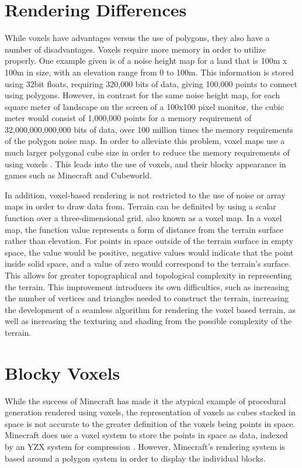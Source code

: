 \documentclass[10pt]{report}
\begin{document}
		\section{Rendering Differences}
		While voxels have advantages versus the use of polygons, they also have a number of disadvantages. Voxels require more memory in order to utilize properly. One example given is of a noise height map for a land that is 100m x 100m in size, with an elevation range from 0 to 100m. This information is stored using 32bit floats, requiring 320,000 bits of data, giving 100,000 points to connect using polygons. However, in contrast for the same noise height map, for each square meter of landscape on the screen of a 100x100 pixel monitor, the cubic meter would consist of 1,000,000 points for a memory requirement of 32,000,000,000,000 bits of data, over 100 million times the memory requirements of the polygon noise map. In order to alleviate this problem, voxel maps use a much larger polygonal cube size in order to reduce the memory requirements of using voxels \cite{high-level-voxel}. This leads into the use of voxels, and their blocky appearance in games such as Minecraft and Cubeworld.
		
		In addition, voxel-based rendering is not restricted to the use of noise or array maps in order to draw data from. Terrain can be definited by using a scalar function over a three-dimensional grid, also known as a voxel map. In a voxel map, the function value represents a form of distance from the terrain surface rather than elevation. For points in space outside of the terrain surface in empty space, the value would be positive, negative values would indicate that the point inside solid space, and a value of zero would correspond to the terrain's surface. This allows for greater topographical and topological complexity in representing the terrain. This improvement introduces its own difficulties, such as increasing the number of vertices and triangles needed to construct the terrain, increasing the development of a seamless algorithm for rendering the voxel based terrain, as well as increasing the texturing and shading from the possible complexity of the terrain. 
		
		\section{Blocky Voxels}
		While the success of Minecraft has made it the atypical example of procedural generation rendered using voxels, the representation of voxels as cubes stacked in space is not accurate to the greater definition of the voxels being points in space. Minecraft does use a voxel system to store the points in space as data, indexed by an YZX system for compression \cite{minecraft-voxel}. However, Minecraft's rendering system is based around a polygon system in order to display the individual blocks. 
		
\end{document}

